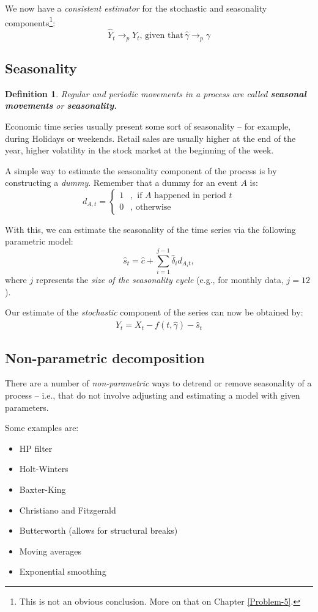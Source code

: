 \documentclass[11pt, a4paper]{report}
\theoremstyle{plain}
\theoremstyle{plain}
\newtheorem{defn}{Definition}[section]
\theoremstyle{remark}
\begin{document}
We now have a \textit{consistent estimator} for the stochastic and seasonality components\footnote{This is not an obvious conclusion. More on that on Chapter \ref{Problem-5}.}:
$$ \hat{Y}_t \to_p Y_t, \, \text{given that} \, \hat{\gamma} \to_p \gamma $$ 

\subsection{Seasonality}

\begin{defn}
	Regular and periodic movements in a process are called \textbf{seasonal movements} or \textbf{seasonality.}
\end{defn}

Economic time series usually present some sort of seasonality -- for example, during Holidays or weekends. Retail sales are usually higher at the end of the year, higher volatility in the stock market at the beginning of the week.

A simple way to estimate the seasonality component of the process is by constructing a \textit{dummy}. Remember that a dummy for an event $A$ is:
$$d_{A, t}=\left\{\begin{array}{ll}
	1 & , \text { if } A \text { happened in period } t \\
	0 & , \text { otherwise }
\end{array}\right.$$

With this, we can estimate the seasonality of the time series via the following parametric model:
$$\hat{s}_{t}=\hat{c}+\sum_{i=1}^{j-1} \hat{\delta}_{i} d_{A_{i} t},$$
where $j$ represents the \textit{size of the seasonality cycle} (e.g., for monthly data, $j = 12$). 

Our estimate of the \textit{stochastic} component of the series can now be obtained by: $$ \hat{Y}_t = X_t - f(t, \hat{\gamma}) - \hat{s}_t $$

\subsection{Non-parametric decomposition}

There are a number of \textit{non-parametric} ways to detrend or remove seasonality of a process -- i.e., that do not involve adjusting and estimating a model with given parameters.

Some examples are:
\begin{itemize}
	\item HP filter
	\item Holt-Winters
	\item Baxter-King
	\item Christiano and Fitzgerald
	\item Butterworth (allows for structural breaks)
	\item Moving averages
	\item Exponential smoothing
\end{itemize}
\end{document}
